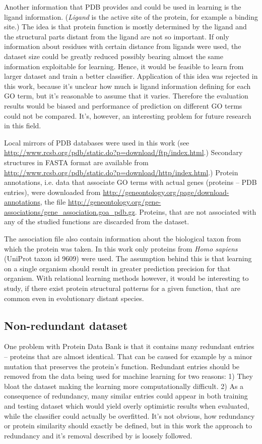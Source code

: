 \documentclass[11pt,twoside,a4paper]{book}
\begin{document}
Another information that PDB provides and could be used in learning is the ligand information.
(\emph{Ligand} is the active site of the protein, for example a binding site.) 
The idea is that protein function is mostly determined by the ligand and the structural parts 
distant from the ligand are not so important.
If only information about residues with certain distance from ligands were used,
the dataset size could be greatly reduced possibly bearing almost the same information
exploitable for learning.
Hence, it would be feasible to learn from larger dataset and train a better classifier.
Application of this idea was rejected in this work,
because it's unclear how much is ligand information defining for each GO term,
but it's reasonable to assume that it varies. 
Therefore the evaluation results would be biased and performance of prediction
on different GO terms could not be compared.
It's, however, an interesting problem for future research in this field.

Local mirrors of PDB databases were used in this work (see \url{http://www.rcsb.org/pdb/static.do?p=download/ftp/index.html}.)
Secondary structures in FASTA format are available from \url{http://www.rcsb.org/pdb/static.do?p=download/http/index.html}.)
Protein annotations, i.e. data that associate GO terms with actual genes (proteins -- PDB entries), were downloaded from
\url{http://geneontology.org/page/download-annotations}, 
the file \url{http://geneontology.org/gene-associations/gene_association.goa_pdb.gz}.
Proteins, that are not associated with any of the studied functions are discarded from the dataset.

The association file also contain information about the biological taxon from which the protein was taken.
In this work only proteins from \emph{Homo sapiens} (UniProt taxon id 9609) were used.
The assumption behind this is that learning on a single organism should result in
greater prediction precision for that organism.
With relational learning methods however, it would be interesting to study, if there exist protein
structural patterns for a given function, that are common even in evolutionary distant species.

\subsection{Non-redundant dataset}
One problem with Protein Data Bank is that it contains many redundant entries --
proteins that are almost identical.
That can be caused for example by a minor mutation that preserves the protein's function.
Redundant entries should be removed from the data being used for machine learning for two reasons:
1) They bloat the dataset making the learning more computationally difficult.
2) As a consequence of redundancy, many similar entries could appear in both training and testing dataset
which would yield overly optimistic results when evaluated, 
while the classifier could actually be overfitted.
It's not obvious, how redundancy or protein similarity should exactly be defined,
but in this work the approach to redundancy and it's removal described by \cite{maxind} is loosely followed.
\end{document}
